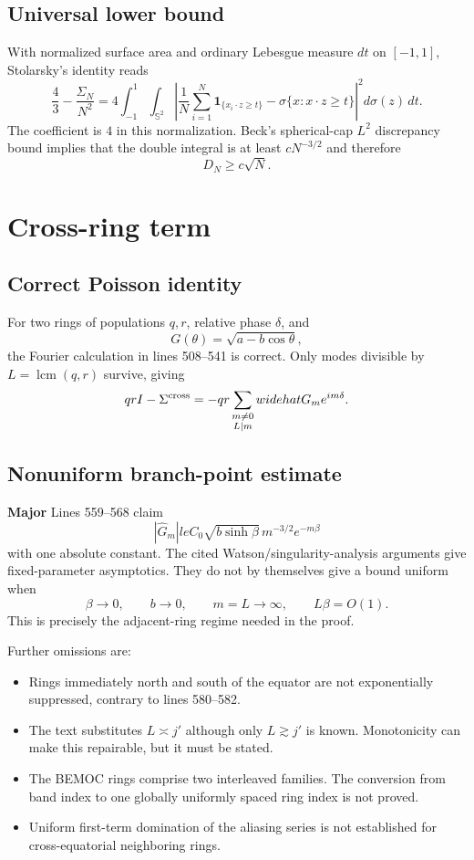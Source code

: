 \documentclass[11pt]{article}
\newcommand{\major}{\textbf{Major}}
\begin{document}
\subsection{Universal lower bound}

With normalized surface area and ordinary Lebesgue measure $dt$ on
$[-1,1]$, Stolarsky's identity reads
\[
 \frac43-\frac{\Sigma_N}{N^2}
 =4\int_{-1}^1\int_{\mathbb S^2}
 \left|\frac1N\sum_{i=1}^N\mathbf1_{\{x_i\cdot z\ge t\}}
 -\sigma\{x:x\cdot z\ge t\}\right|^2d\sigma(z)\,dt.
\]
The coefficient is $4$ in this normalization.  Beck's spherical-cap
$L^2$ discrepancy bound implies that the double integral is at least
$cN^{-3/2}$ and therefore
\[
 D_N\ge c\sqrt N.
\]

\section{Cross-ring term}

\subsection{Correct Poisson identity}

For two rings of populations $q,r$, relative phase $\delta$, and
\[
 G(\theta)=\sqrt{a-b\cos\theta},
\]
the Fourier calculation in lines 508--541 is correct.  Only modes divisible
by $L=\operatorname{lcm}(q,r)$ survive, giving
\[
 qr I-\Sigma^{\rm cross}
 =-qr\sum_{\substack{m\ne0\\L\mid m}}widehat G_m e^{im\delta}.
\]

\subsection{Nonuniform branch-point estimate}

\major{} Lines 559--568 claim
\[
 |\widehat G_m|le C_0\sqrt{b\sinh\beta}\,
 m^{-3/2}e^{-m\beta}
\]
with one absolute constant.  The cited Watson/singularity-analysis arguments
give fixed-parameter asymptotics.  They do not by themselves give a bound
uniform when
\[
 \beta\to0,\qquad b\to0,
 \qquad m=L\to\infty,
 \qquad L\beta=O(1).
\]
This is precisely the adjacent-ring regime needed in the proof.

Further omissions are:
\begin{itemize}
\item Rings immediately north and south of the equator are not exponentially
suppressed, contrary to lines 580--582.
\item The text substitutes $L\asymp j'$ although only $L\gtrsim j'$ is known.
Monotonicity can make this repairable, but it must be stated.
\item The BEMOC rings comprise two interleaved families.  The conversion from
band index to one globally uniformly spaced ring index is not proved.
\item Uniform first-term domination of the aliasing series is not established
for cross-equatorial neighboring rings.
\end{itemize}
\end{document}
